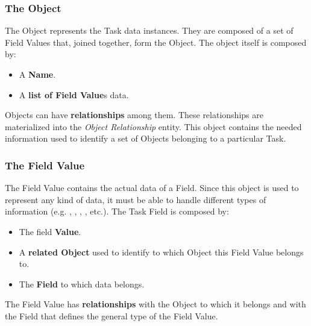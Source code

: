 \subsubsection{The Object}
The Object represents the Task data instances. They are composed of a set of
Field Values that, joined together, form the Object. The object itself is
composed by:
\begin{itemize}
    \item A \textbf{Name}.
    \item A \textbf{list of Field Value}s data.
\end{itemize}

Objects can have \textbf{relationships} among them. These relationships are
materialized into the \emph{Object Relationship} entity. This object contains
the needed information used to identify a set of Objects belonging to a
particular Task.



\subsubsection{The Field Value}
The Field Value contains the actual data of a Field. Since this object is used
to represent any kind of data, it must be able to handle different types of
information (e.g. , , , , etc.).
The Task Field is composed by:
\begin{itemize}
    \item The field \textbf{Value}.
    \item A \textbf{related Object} used to identify to which Object this Field
    Value belongs to.
    \item The \textbf{Field} to which data belongs.
\end{itemize}

The Field Value has \textbf{relationships} with the Object to which it belongs
and with the Field that defines the general type of the Field Value.








